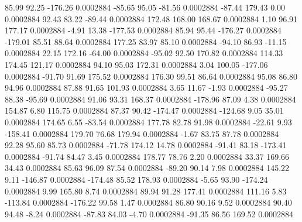        85.99       92.25     -176.26     0.0002884
      -85.65       95.05      -81.56     0.0002884
      -87.44      179.43        0.00     0.0002884
       92.43       83.22      -89.44     0.0002884
      172.48      168.00      168.67     0.0002884
        1.10       96.91      177.17     0.0002884
       -4.91       13.38     -177.53     0.0002884
       85.94       95.44     -176.27     0.0002884
     -179.01       85.51       88.64     0.0002884
      177.25       83.97       85.10     0.0002884
      -94.10       86.93      -11.15     0.0002884
       22.15      172.16      -64.00     0.0002884
      -95.02       92.50      170.82     0.0002884
      114.33      174.45      121.17     0.0002884
       94.10       95.03      172.31     0.0002884
        3.04      100.05     -177.06     0.0002884
      -91.70       91.69      175.52     0.0002884
      176.30       99.51       86.64     0.0002884
       95.08       86.80       94.96     0.0002884
       87.88       91.65      101.93     0.0002884
        3.65       11.67       -1.93     0.0002884
      -95.27       88.38      -95.69     0.0002884
       91.06       93.31      168.37     0.0002884
     -178.96       87.09        4.38     0.0002884
      154.87        6.80      115.75     0.0002884
       87.37       90.42     -174.47     0.0002884
     -124.68        9.05       35.01     0.0002884
      174.65        6.55      -83.54     0.0002884
      177.78       82.78       91.98     0.0002884
      -22.61        9.93     -158.41     0.0002884
      179.70       76.68      179.94     0.0002884
       -1.67       83.75       87.78     0.0002884
       92.28       95.60       85.73     0.0002884
      -71.78      174.12       14.78     0.0002884
      -91.41       83.18     -173.41     0.0002884
      -91.74       84.47        3.45     0.0002884
      178.77       78.76        2.20     0.0002884
       33.37      169.66       34.43     0.0002884
       85.63       96.09       87.54     0.0002884
      -89.20       90.14        7.98     0.0002884
      145.22        9.11     -146.87     0.0002884
     -174.48       85.52      178.93     0.0002884
       -5.65       93.90     -174.24     0.0002884
        9.99      165.80        8.74     0.0002884
       89.94       91.28      177.41     0.0002884
      111.16        5.83     -113.84     0.0002884
     -176.22       99.58        1.47     0.0002884
       86.80       90.16        9.52     0.0002884
       90.40       94.48       -8.24     0.0002884
      -87.83       84.03       -4.70     0.0002884
      -91.35       86.56      169.52     0.0002884
